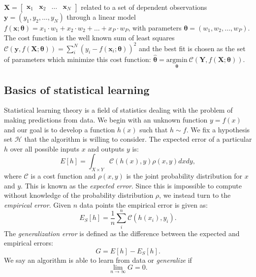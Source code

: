 $ \bm{X} = 
\begin{bmatrix}
\bm{x}_1 & \bm{x}_2 & \dots & \bm{x}_N
\end{bmatrix}
$
related to a set of dependent observations $\bm{y} = (y_1, y_2, \dots,y_N)$
through a linear model 
$f(\bm{x} ; \bm{\theta}) = 
x_1\cdot w_1 + x_2\cdot w_2 + \dots + x_P\cdot w_P$,
with parameters $\bm{\theta} = (w_1, w_2, \dots,w_P)$. The cost function
is the well known sum of least squares $\mathcal{C}(\bm{y}, f(\bm{X} ; \bm{\theta}))
= \sum_i^N (y_i - f(\bm{x}_i ; \bm{\theta}))^2 $ and the best fit is chosen as the set
of parameters which minimize this cost function: $\hat{\bm{\theta}} = \underset{\bm{\theta}}
{\text{argmin}} \ \mathcal{C}(\bm{Y}, f(\bm{X} ; \bm{\theta})) $.

\subsection{Basics of statistical learning}
Statistical learning theory is a field of statistics dealing with the problem
of making predictions from data. We begin with an unknown function \newline
$y = f(x)$ and our goal is to develop a function $h(x)$
such that $h \sim f$. We fix a hypothesis set $\mathcal{H}$ that the
algorithm is willing to consider. The expected error of a particular $h$
over all possible inputs $x$ and outputs $y$ is:
$$ E[h] = \int_{X \times Y} \mathcal{C}(h(x), y) \rho(x,y) dx dy ,$$
where $\mathcal{C}$ is a cost function and $\rho(x,y)$ is the joint probability
distribution for $x$ and $y$. This is known as the \textit{expected error}.
Since this is impossible to compute without knowledge of the probability distribution
$\rho$, we instead turn to the \textit{empirical error}. Given $n$ data points
the empirical error is given as:
$$ E_S[h] = \frac{1}{n} \sum_i^n \mathcal{C}(h(x_i), y_i) .$$
The \textit{generalization error} is defined as the difference
between the expected and empirical errors:
$$ G = E[h] - E_S[h] .$$
We say an algorithm is able to learn from data or \textit{generalize} if 
$$ \lim_{n\to\infty} G = 0 .$$


